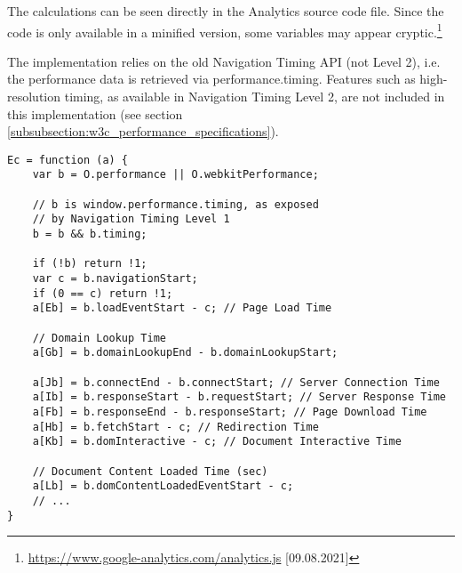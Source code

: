 
The calculations can be seen directly in the Analytics source code file.
Since the code is only available in a minified version, some variables may appear cryptic.\footnote{\url{
https://www.google-analytics.com/analytics.js} [09.08.2021]}

The implementation relies on the old Navigation Timing API (not Level 2), i.e. the performance data is retrieved via performance.timing.
Features such as high-resolution timing, as available in Navigation Timing Level 2, are not included in this implementation (see section \ref{subsubsection:w3c_performance_specifications}).

\begin{center}
\begin{lstlisting}[caption={Performance Metrics Calculations in analytics.js}, label={listing:analyticsjs}, numbers=none]
Ec = function (a) {
	var b = O.performance || O.webkitPerformance;

	// b is window.performance.timing, as exposed
	// by Navigation Timing Level 1
	b = b && b.timing;

	if (!b) return !1;
	var c = b.navigationStart;
	if (0 == c) return !1;
	a[Eb] = b.loadEventStart - c; // Page Load Time
	
	// Domain Lookup Time
	a[Gb] = b.domainLookupEnd - b.domainLookupStart;
	
	a[Jb] = b.connectEnd - b.connectStart; // Server Connection Time
	a[Ib] = b.responseStart - b.requestStart; // Server Response Time
	a[Fb] = b.responseEnd - b.responseStart; // Page Download Time
	a[Hb] = b.fetchStart - c; // Redirection Time
	a[Kb] = b.domInteractive - c; // Document Interactive Time
	
	// Document Content Loaded Time (sec)
	a[Lb] = b.domContentLoadedEventStart - c;
	// ...
}
\end{lstlisting}
\end{center}







